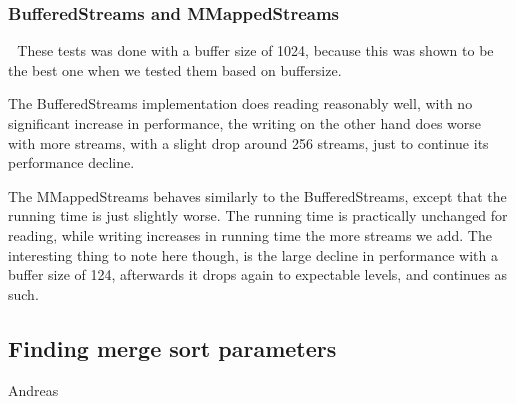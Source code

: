 \subsubsection{BufferedStreams and MMappedStreams}
\includegraphics[width=0.5]{BS.png}
\includegraphics[width=0.5]{MMS.png}
These tests was done with a buffer size of 1024, because this was shown to be the best one when we tested them based on buffersize. 

The BufferedStreams implementation does reading reasonably well, with no significant increase in performance, the writing on the other hand does worse with more streams, with a slight drop around 256 streams, just to continue its performance decline. 

The MMappedStreams behaves similarly to the BufferedStreams, except that the running time is just slightly worse. The running time is practically unchanged for reading, while writing increases in running time the more streams we add. The interesting thing to note here though, is the large decline in performance with a buffer size of 124, afterwards it drops again to expectable levels, and continues as such. 

\subsection{ Finding merge sort parameters}
Andreas

